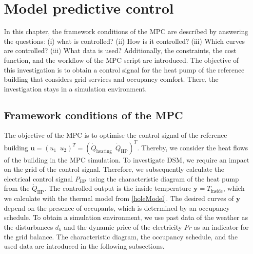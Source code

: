 \chapter{Model predictive control}
\label{ch:mpc}
In this chapter, the framework conditions of the MPC are described by answering the questions: (i) what is controlled? (ii) How is it controlled? (iii) Which curves are controlled? (iii) What data is used? Additionally, the constraints, the cost function, and the workflow of the MPC script are introduced. The objective of this investigation is to obtain a control signal for the heat pump of the reference building that considers grid services and occupancy comfort. There, the investigation stays in a simulation environment. \newline

\section{Framework conditions of the MPC}
\label{section:FrameworkMPC}
The objective of the MPC is to optimise the control signal of the reference building \newline $\mathbf{u} = (u_1 \enspace u_2)^T = (\dot{Q}_\text{heating} \enspace \dot{Q}_\text{HP})^T$. Thereby, we consider the heat flows of the building in the MPC simulation. To investigate DSM, we require an impact on the grid of the control signal. Therefore, we subsequently calculate the electrical control signal $P_\text{HP}$ using the characteristic diagram of the heat pump from the $\dot{Q}_\text{HP}$. The controlled output is the inside temperature $\mathbf{y} = T_\text{inside}$, which we calculate with the thermal model from \autoref{holeModel}. The desired curves of $\mathbf{y}$ depend on the presence of occupants, which is determined by an occupancy schedule. To obtain a simulation environment, we use past data of the weather as the disturbances $d_\text{k}$ and the dynamic price of the electricity $Pr$  as an indicator for the grid balance. The characteristic diagram, the occupancy schedule, and the used data are introduced in the following subsections.    

